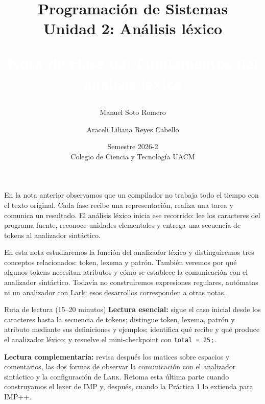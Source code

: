 \documentclass[11pt,spanish]{article}
\newcommand{\cf}[2]{%
    \colorbox{#1}{\textcolor{white}{\strut #2}}%
}
\begin{document}

\title{Programación de Sistemas\\
Unidad 2: Análisis léxico\\ \bigskip
\cf{rojo7a3c3d}{\textbf{\Large Nota de clase 03: Fundamentos del análisis léxico}}}
\author{Manuel Soto Romero \and Araceli Liliana Reyes Cabello}
\date{Semestre 2026-2 \\ Colegio de Ciencia y Tecnología UACM}

\maketitle
\renewcommand*{\thefootnote}{\arabic{footnote}}
\setcounter{footnote}{0}

En la nota anterior observamos que un compilador no trabaja todo el tiempo con el texto original. Cada fase recibe una representación, realiza una tarea y comunica un resultado. El análisis léxico inicia ese recorrido: lee los caracteres del programa fuente, reconoce unidades elementales y entrega una secuencia de tokens al analizador sintáctico.

En esta nota estudiaremos la función del analizador léxico y distinguiremos tres conceptos relacionados: token, lexema y patrón. También veremos por qué algunos tokens necesitan atributos y cómo se establece la comunicación con el analizador sintáctico. Todavía no construiremos expresiones regulares, autómatas ni un analizador con Lark; esos desarrollos corresponden a otras notas.

\begin{ruta}{Ruta de lectura (15--20 minutos)}
\textbf{Lectura esencial:} sigue el caso inicial desde los caracteres hasta la secuencia de tokens; distingue token, lexema, patrón y atributo mediante sus definiciones y ejemplos; identifica qué recibe y qué produce el analizador léxico; y resuelve el mini-checkpoint con \texttt{total = 25;}.

\textbf{Lectura complementaria:} revisa después los matices sobre espacios y comentarios, las dos formas de observar la comunicación con el analizador sintáctico y la configuración de \textsc{Lark}. Retoma esta última parte cuando construyamos el lexer de \textsc{IMP} y, después, cuando la Práctica 1 lo extienda para \textsc{IMP++}.
\end{ruta}
\end{document}
